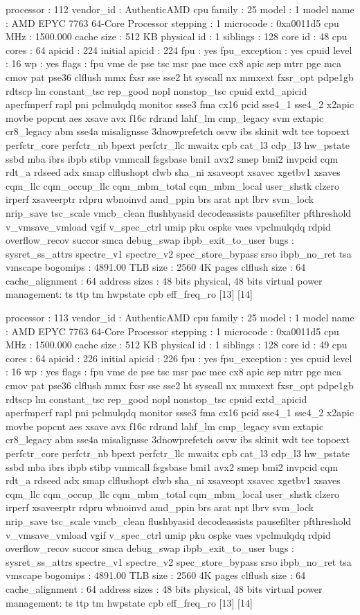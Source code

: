 processor	: 112
vendor_id	: AuthenticAMD
cpu family	: 25
model		: 1
model name	: AMD EPYC 7763 64-Core Processor
stepping	: 1
microcode	: 0xa0011d5
cpu MHz		: 1500.000
cache size	: 512 KB
physical id	: 1
siblings	: 128
core id		: 48
cpu cores	: 64
apicid		: 224
initial apicid	: 224
fpu		: yes
fpu_exception	: yes
cpuid level	: 16
wp		: yes
flags		: fpu vme de pse tsc msr pae mce cx8 apic sep mtrr pge mca cmov pat pse36 clflush mmx fxsr sse sse2 ht syscall nx mmxext fxsr_opt pdpe1gb rdtscp lm constant_tsc rep_good nopl nonstop_tsc cpuid extd_apicid aperfmperf rapl pni pclmulqdq monitor ssse3 fma cx16 pcid sse4_1 sse4_2 x2apic movbe popcnt aes xsave avx f16c rdrand lahf_lm cmp_legacy svm extapic cr8_legacy abm sse4a misalignsse 3dnowprefetch osvw ibs skinit wdt tce topoext perfctr_core perfctr_nb bpext perfctr_llc mwaitx cpb cat_l3 cdp_l3 hw_pstate ssbd mba ibrs ibpb stibp vmmcall fsgsbase bmi1 avx2 smep bmi2 invpcid cqm rdt_a rdseed adx smap clflushopt clwb sha_ni xsaveopt xsavec xgetbv1 xsaves cqm_llc cqm_occup_llc cqm_mbm_total cqm_mbm_local user_shstk clzero irperf xsaveerptr rdpru wbnoinvd amd_ppin brs arat npt lbrv svm_lock nrip_save tsc_scale vmcb_clean flushbyasid decodeassists pausefilter pfthreshold v_vmsave_vmload vgif v_spec_ctrl umip pku ospke vaes vpclmulqdq rdpid overflow_recov succor smca debug_swap ibpb_exit_to_user
bugs		: sysret_ss_attrs spectre_v1 spectre_v2 spec_store_bypass srso ibpb_no_ret tsa vmscape
bogomips	: 4891.00
TLB size	: 2560 4K pages
clflush size	: 64
cache_alignment	: 64
address sizes	: 48 bits physical, 48 bits virtual
power management: ts ttp tm hwpstate cpb eff_freq_ro [13] [14]

processor	: 113
vendor_id	: AuthenticAMD
cpu family	: 25
model		: 1
model name	: AMD EPYC 7763 64-Core Processor
stepping	: 1
microcode	: 0xa0011d5
cpu MHz		: 1500.000
cache size	: 512 KB
physical id	: 1
siblings	: 128
core id		: 49
cpu cores	: 64
apicid		: 226
initial apicid	: 226
fpu		: yes
fpu_exception	: yes
cpuid level	: 16
wp		: yes
flags		: fpu vme de pse tsc msr pae mce cx8 apic sep mtrr pge mca cmov pat pse36 clflush mmx fxsr sse sse2 ht syscall nx mmxext fxsr_opt pdpe1gb rdtscp lm constant_tsc rep_good nopl nonstop_tsc cpuid extd_apicid aperfmperf rapl pni pclmulqdq monitor ssse3 fma cx16 pcid sse4_1 sse4_2 x2apic movbe popcnt aes xsave avx f16c rdrand lahf_lm cmp_legacy svm extapic cr8_legacy abm sse4a misalignsse 3dnowprefetch osvw ibs skinit wdt tce topoext perfctr_core perfctr_nb bpext perfctr_llc mwaitx cpb cat_l3 cdp_l3 hw_pstate ssbd mba ibrs ibpb stibp vmmcall fsgsbase bmi1 avx2 smep bmi2 invpcid cqm rdt_a rdseed adx smap clflushopt clwb sha_ni xsaveopt xsavec xgetbv1 xsaves cqm_llc cqm_occup_llc cqm_mbm_total cqm_mbm_local user_shstk clzero irperf xsaveerptr rdpru wbnoinvd amd_ppin brs arat npt lbrv svm_lock nrip_save tsc_scale vmcb_clean flushbyasid decodeassists pausefilter pfthreshold v_vmsave_vmload vgif v_spec_ctrl umip pku ospke vaes vpclmulqdq rdpid overflow_recov succor smca debug_swap ibpb_exit_to_user
bugs		: sysret_ss_attrs spectre_v1 spectre_v2 spec_store_bypass srso ibpb_no_ret tsa vmscape
bogomips	: 4891.00
TLB size	: 2560 4K pages
clflush size	: 64
cache_alignment	: 64
address sizes	: 48 bits physical, 48 bits virtual
power management: ts ttp tm hwpstate cpb eff_freq_ro [13] [14]


